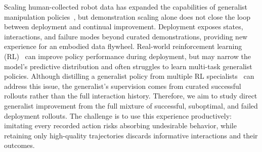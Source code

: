 
Scaling human-collected robot data has expanded the capabilities of generalist manipulation policies~\citep{o2024open}, but demonstration scaling alone does not close the loop between deployment and continual improvement.
Deployment exposes states, interactions, and failure modes beyond curated demonstrations, providing new experience for an embodied data flywheel.
Real-world reinforcement learning (RL)~\citep{xu2026rlt} can improve policy performance during deployment, but may narrow the model's predictive distribution and often struggles to learn multi-task generalist policies.
Although distilling a generalist policy from multiple RL specialists~\citep{xiao2025pld} can address this issue, the generalist's supervision comes from curated successful rollouts rather than the full interaction history.
Therefore, we aim to study direct generalist improvement from the full mixture of successful, suboptimal, and failed deployment rollouts.
The challenge is to use this experience productively: imitating every recorded action risks absorbing undesirable behavior, while retaining only high-quality trajectories discards informative interactions and their outcomes.


